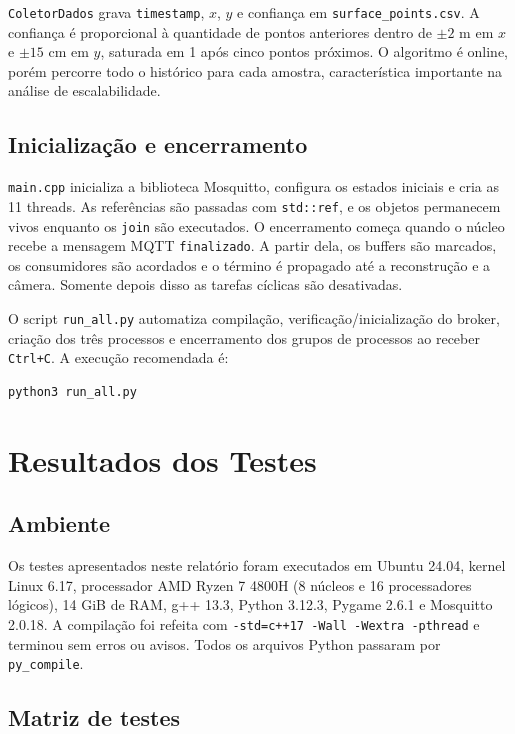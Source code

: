 \documentclass[12pt,a4paper]{article}
\begin{document}
\texttt{ColetorDados} grava \texttt{timestamp}, $x$, $y$ e confiança em \texttt{surface\_points.csv}. A confiança é proporcional à quantidade de pontos anteriores dentro de $\pm2$ m em $x$ e $\pm15$ cm em $y$, saturada em 1 após cinco pontos próximos. O algoritmo é online, porém percorre todo o histórico para cada amostra, característica importante na análise de escalabilidade.

\subsection{Inicialização e encerramento}

\texttt{main.cpp} inicializa a biblioteca Mosquitto, configura os estados iniciais e cria as 11 threads. As referências são passadas com \texttt{std::ref}, e os objetos permanecem vivos enquanto os \texttt{join} são executados. O encerramento começa quando o núcleo recebe a mensagem MQTT \texttt{finalizado}. A partir dela, os buffers são marcados, os consumidores são acordados e o término é propagado até a reconstrução e a câmera. Somente depois disso as tarefas cíclicas são desativadas.

O script \texttt{run\_all.py} automatiza compilação, verificação/inicialização do broker, criação dos três processos e encerramento dos grupos de processos ao receber \texttt{Ctrl+C}. A execução recomendada é:

\begin{lstlisting}[style=textstyle]
python3 run_all.py
\end{lstlisting}

\section{Resultados dos Testes}

\subsection{Ambiente}

Os testes apresentados neste relatório foram executados em Ubuntu 24.04, kernel Linux 6.17, processador AMD Ryzen 7 4800H (8 núcleos e 16 processadores lógicos), 14 GiB de RAM, g++ 13.3, Python 3.12.3, Pygame 2.6.1 e Mosquitto 2.0.18. A compilação foi refeita com \texttt{-std=c++17 -Wall -Wextra -pthread} e terminou sem erros ou avisos. Todos os arquivos Python passaram por \texttt{py\_compile}.

\subsection{Matriz de testes}
\end{document}
